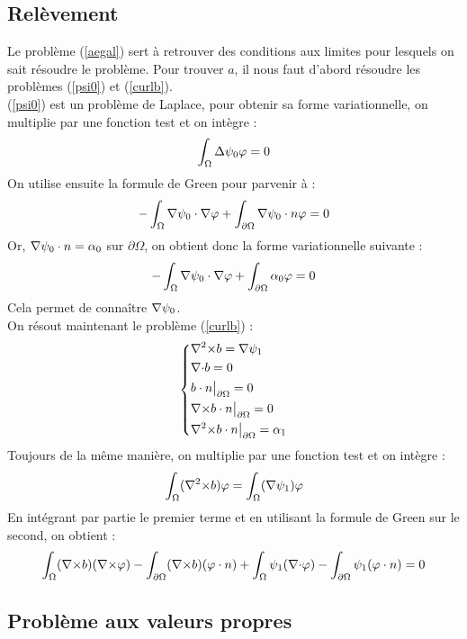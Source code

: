 \subsection{Relèvement}
\label{relev}

Le problème (\ref{aegal}) sert à retrouver des conditions aux limites pour lesquels on sait résoudre le problème. Pour trouver $a$, il nous faut d'abord résoudre les problèmes (\ref{psi0}) et (\ref{curlb}).\\

(\ref{psi0}) est un problème de Laplace, pour obtenir sa forme variationnelle, on multiplie par une fonction test et on intègre :
\[
\int_\Omega {\Delta}\psi_0 \varphi = 0
\]
On utilise ensuite la formule de Green pour parvenir à :
\[
-\int_\Omega {\nabla}\psi_0\cdot{\nabla}\varphi + \int_{\partial\Omega} {\nabla}\psi_0\cdot n\varphi = 0
\]
Or, ${\nabla}\psi_0\cdot n = \alpha_0$ sur $\partial\Omega$, on obtient donc la forme variationnelle suivante :
\begin{eqnarray}
\label{fvpsi}
-\int_\Omega {\nabla}\psi_0\cdot{\nabla}\varphi + \int_{\partial\Omega} \alpha_0\varphi = 0
\end{eqnarray}
Cela permet de connaître ${\nabla}\psi_0$.\\

On résout maintenant le problème (\ref{curlb}) :
\begin{eqnarray*}
\left\{
\begin{aligned}
&{\nabla^2\times} b = {\nabla}\psi_1\\
&{\nabla\cdot} b = 0\\
&b\cdot n{\big\rvert_{\partial\Omega}} = 0\\
&{\nabla\times} b\cdot n{\big\rvert_{\partial\Omega}} = 0\\
&{\nabla^2\times} b\cdot n{\big\rvert_{\partial\Omega}} = \alpha_1
\end{aligned}
\right.
\end{eqnarray*}
Toujours de la même manière, on multiplie par une fonction test et on intègre :
\[
\int_\Omega ({\nabla^2\times} b) \varphi = \int_\Omega ({\nabla}\psi_1)\varphi
\]
En intégrant par partie le premier terme et en utilisant la formule de Green sur le second, on obtient :
\begin{eqnarray}
\label{fvrelev}
\int_\Omega ({\nabla\times} b)({\nabla\times}\varphi) - \int_{\partial\Omega} ({\nabla\times} b)(\varphi\cdot n) +\int_\Omega \psi_1({\nabla\cdot}\varphi) - \int_{\partial\Omega} \psi_1(\varphi\cdot n) = 0
\end{eqnarray}

\subsection{Problème aux valeurs propres}
\label{eigen}

